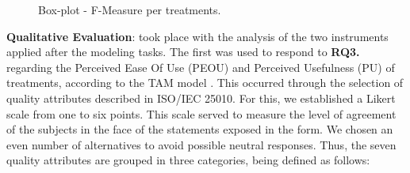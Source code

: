\documentclass[a4paper,twoside,anonymous]{article}
\begin{document}
\begin{figure}[!htb]
    \centering
    
    \caption{Box-plot - F-Measure per treatments.}
    \label{fig:BoxPlotMedidaF}
\end{figure}


\textbf{Qualitative Evaluation}: took place with the analysis of the two instruments applied after the modeling tasks.
The first was used to respond to \textbf{RQ3.} regarding the Perceived Ease Of Use (PEOU) and Perceived Usefulness (PU) of treatments, according to the TAM model \citep{Davis:1989}. 
This occurred through the selection of quality attributes described in ISO/IEC 25010.
For this, we established a Likert scale from one to six points.
This scale served to measure the level of agreement of the subjects in the face of the statements exposed in the form.
We chosen an even number of alternatives to avoid possible neutral responses.
Thus, the seven quality attributes are grouped in three categories, being defined as follows:
\end{document}
